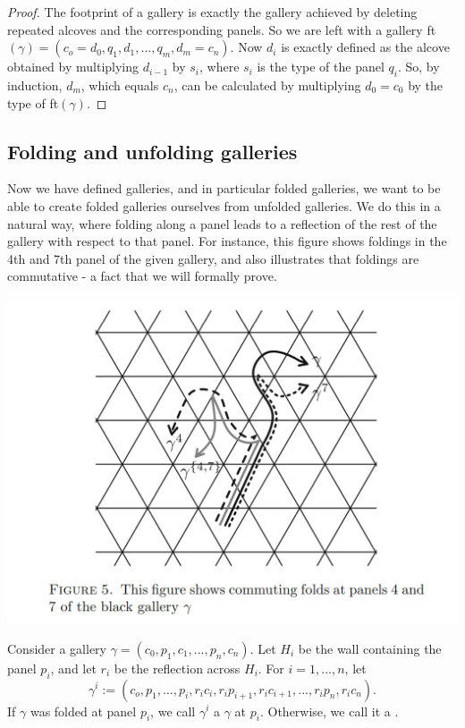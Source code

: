 \documentclass[11pt]{article}
\begin{document}
\begin{proof}
    The footprint of a gallery is exactly the gallery achieved by deleting repeated alcoves and the corresponding panels. So we are left with a gallery ft$(\gamma)=(c_o=d_0,q_1,d_1,...,q_m,d_m=c_n)$. Now $d_i$ is exactly defined as the alcove obtained by multiplying $d_{i-1}$ by $s_i$, where $s_i$ is the type of the panel $q_i$. So, by induction, $d_m$, which equals $c_n$, can be calculated by multiplying $d_0=c_0$ by the type of ft$(\gamma)$. 
\end{proof}

\subsection{Folding and unfolding galleries}

Now we have defined galleries, and in particular folded galleries, we want to be able to create folded galleries ourselves from unfolded galleries. We do this in a natural way, where folding along a panel leads to a reflection of the rest of the gallery with respect to that panel. For instance, this figure shows foldings in the 4th and 7th panel of the given gallery, and also illustrates that foldings are commutative - a fact that we will formally prove.
\begin{center}
\includegraphics[scale=0.4]{Screenshot 2023-02-03 153412.png}\\
\end{center}

\begin{definition}
    Consider a gallery $\gamma = (c_0,p_1,c_1,...,p_n,c_n)$. Let $H_i$ be the wall containing the panel $p_i$, and let $r_i$ be the reflection across $H_i$. For $i=1,...,n$, let
    \[\gamma^i:=(c_o,p_1,...,p_i,r_ic_i,r_ip_{i+1},r_ic_{i+1},...,r_ip_n,r_ic_n).\]
    If $\gamma$ was folded at panel $p_i$, we call $\gamma^i$ a $\gamma$ at $p_i$. Otherwise, we call it a .
\end{definition}
\end{document}
